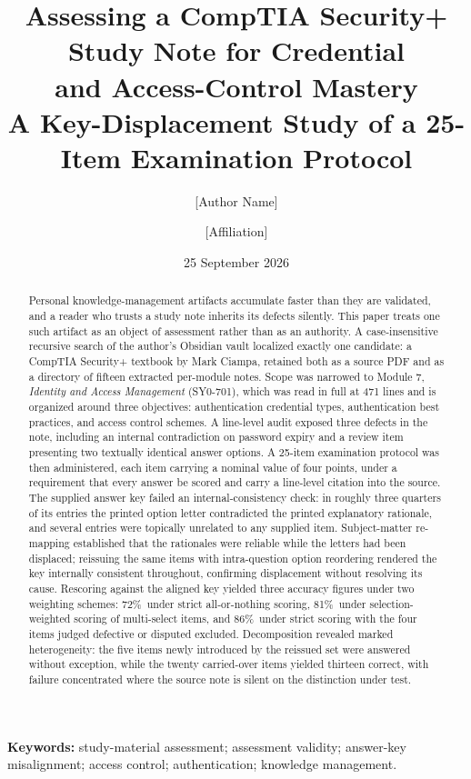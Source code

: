\documentclass[11pt]{article}
\title{\textbf{Assessing a CompTIA Security+ Study Note for Credential\\
and Access-Control Mastery}\\[0.35em]
\large A Key-Displacement Study of a 25-Item Examination Protocol}
\author{[Author Name] \and [Affiliation]}
\date{25 September 2026}
\newcommand{\pct}{\%}
\begin{document}
\maketitle

\begin{abstract}
\noindent
Personal knowledge-management artifacts accumulate faster than they are
validated, and a reader who trusts a study note inherits its defects
silently. This paper treats one such artifact as an object of assessment
rather than as an authority. A case-insensitive recursive search of the
author's Obsidian vault localized exactly one candidate: a CompTIA
Security+ textbook by Mark Ciampa, retained both as a source PDF and as a
directory of fifteen extracted per-module notes. Scope was narrowed to
Module 7, \emph{Identity and Access Management} (SY0-701), which was read
in full at 471 lines and is organized around three objectives:
authentication credential types, authentication best practices, and access
control schemes. A line-level audit exposed three defects in the note,
including an internal contradiction on password expiry and a review item
presenting two textually identical answer options. A 25-item examination
protocol was then administered, each item carrying a nominal value of four
points, under a requirement that every answer be scored and carry a
line-level citation into the source. The supplied answer key failed an
internal-consistency check: in roughly three quarters of its entries the
printed option letter contradicted the printed explanatory rationale, and
several entries were topically unrelated to any supplied item. Subject-matter
re-mapping established that the rationales were reliable while the letters
had been displaced; reissuing the same items with intra-question option
reordering rendered the key internally consistent throughout, confirming
displacement without resolving its cause. Rescoring against the aligned key
yielded three accuracy figures under two weighting schemes: 72\pct\ under
strict all-or-nothing scoring, 81\pct\ under selection-weighted scoring of
multi-select items, and 86\pct\ under strict scoring with the four items
judged defective or disputed excluded. Decomposition revealed marked
heterogeneity: the five items newly introduced by the reissued set were
answered without exception, while the twenty carried-over items yielded
thirteen correct, with failure concentrated where the source note is silent
on the distinction under test.
\end{abstract}

\noindent\textbf{Keywords:} study-material assessment; assessment validity;
answer-key misalignment; access control; authentication; knowledge
management.
\end{document}
